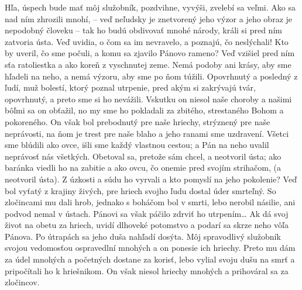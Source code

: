 Hľa, úspech bude mať môj služobník, pozdvihne, vyvýši, zvelebí sa veľmi.
Ako sa nad ním zhrozili mnohí, – veď neľudsky je znetvorený jeho výzor a jeho obraz je nepodobný človeku – tak ho budú obdivovať mnohé národy, králi si pred ním zatvoria ústa.
Veď uvidia, o čom sa im nevravelo, a poznajú, čo neslýchali! 
Kto by uveril, čo sme počuli, a komu sa zjavilo Pánovo rameno?
\versseparator
Veď vzišiel pred ním sťa ratoliestka a ako koreň z vyschnutej zeme.
Nemá podoby ani krásy, aby sme hľadeli na neho, a nemá výzoru, aby sme po ňom túžili. Opovrhnutý a posledný z ľudí, muž bolestí, ktorý poznal utrpenie, pred akým si zakrývajú tvár, opovrhnutý, a preto sme si ho nevážili.
\versseparator
Vskutku on niesol naše choroby a našimi bôľmi sa on obťažil, no my sme ho pokladali za zbitého, strestaného Bohom a pokoreného.
On však bol prebodnutý pre naše hriechy, strýznený pre naše neprávosti, na ňom je trest pre naše blaho a jeho ranami sme uzdravení.
\versseparator
Všetci sme blúdili ako ovce, išli sme každý vlastnou cestou; a Pán na neho uvalil neprávosť nás všetkých. 
Obetoval sa, pretože sám chcel, a neotvoril ústa; ako baránka viedli ho na zabitie a ako ovcu, čo onemie pred svojím strihačom, (a neotvoril ústa).
\versseparator
Z úzkosti a súdu ho vyrvali a kto pomyslí na jeho pokolenie?
Veď bol vyťatý z krajiny živých, pre hriech svojho ľudu dostal úder smrteľný.
So zločincami mu dali hrob, jednako s boháčom bol v smrti, lebo nerobil násilie, ani podvod nemal v ústach.
\versseparator
Pánovi sa však páčilo zdrviť ho utrpením… Ak dá svoj život na obetu za hriech, uvidí dlhoveké potomstvo a podarí sa skrze neho vôľa Pánova.
Po útrapách sa jeho duša nahľadí dosýta. Môj spravodlivý služobník svojou vedomosťou ospravedlní mnohých a on ponesie ich hriechy.
\versseparator
Preto mu dám za údel mnohých a početných dostane za korisť, lebo vylial svoju dušu na smrť a pripočítali ho k hriešnikom.
On však niesol hriechy mnohých a prihováral sa za zločincov.